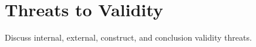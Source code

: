 \section{Threats to Validity}
\label{sec:threats}

Discuss internal, external, construct, and conclusion validity threats.

